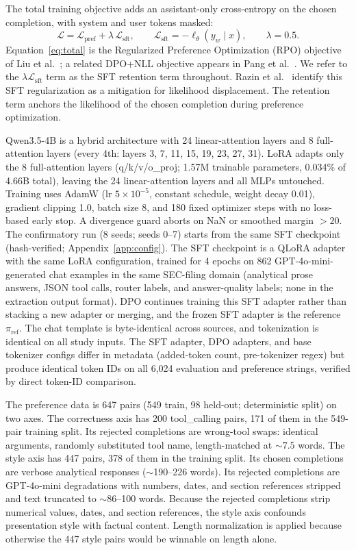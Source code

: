 \documentclass{article}
\begin{document}
The total training objective adds an assistant-only cross-entropy on the chosen completion, with system and user tokens masked:
\begin{equation}
\mathcal{L} = \mathcal{L}_{\text{pref}} + \lambda\, \mathcal{L}_{\text{sft}}, \qquad \mathcal{L}_{\text{sft}} = -\ell_\theta(y_w \mid x), \qquad \lambda = 0.5.
\label{eq:total}
\end{equation}
Equation~\eqref{eq:total} is the Regularized Preference Optimization (RPO) objective of Liu et al.\ \citep{liu2024rpo}; a related DPO+NLL objective appears in Pang et al.\ \citep{pang2024iterative}. We refer to the $\lambda \mathcal{L}_{\text{sft}}$ term as the SFT retention term throughout. Razin et al.\ \citep{razin2025displacement} identify this SFT regularization as a mitigation for likelihood displacement. The retention term anchors the likelihood of the chosen completion during preference optimization.

Qwen3.5-4B is a hybrid architecture with 24 linear-attention layers and 8 full-attention layers (every 4th: layers 3, 7, 11, 15, 19, 23, 27, 31). LoRA adapts only the 8 full-attention layers (q/k/v/o\_proj; 1.57M trainable parameters, 0.034\% of 4.66B total), leaving the 24 linear-attention layers and all MLPs untouched. Training uses AdamW (lr $5\times10^{-5}$, constant schedule, weight decay 0.01), gradient clipping 1.0, batch size 8, and 180 fixed optimizer steps with no loss-based early stop. A divergence guard aborts on NaN or smoothed margin $>20$. The confirmatory run (8 seeds; seeds 0--7) starts from the same SFT checkpoint (hash-verified; Appendix~\ref{app:config}). The SFT checkpoint is a QLoRA adapter with the same LoRA configuration, trained for 4 epochs on 862 GPT-4o-mini-generated chat examples in the same SEC-filing domain (analytical prose answers, JSON tool calls, router labels, and answer-quality labels; none in the extraction output format). DPO continues training this SFT adapter rather than stacking a new adapter or merging, and the frozen SFT adapter is the reference $\pi_{\text{ref}}$. The chat template is byte-identical across sources, and tokenization is identical on all study inputs. The SFT adapter, DPO adapters, and base tokenizer configs differ in metadata (added-token count, pre-tokenizer regex) but produce identical token IDs on all 6{,}024 evaluation and preference strings, verified by direct token-ID comparison.

The preference data is 647 pairs (549 train, 98 held-out; deterministic split) on two axes. The correctness axis has 200 tool\_calling pairs, 171 of them in the 549-pair training split. Its rejected completions are wrong-tool swaps: identical arguments, randomly substituted tool name, length-matched at ${\sim}7.5$ words. The style axis has 447 pairs, 378 of them in the training split. Its chosen completions are verbose analytical responses ($\sim$190--226 words). Its rejected completions are GPT-4o-mini degradations with numbers, dates, and section references stripped and text truncated to $\sim$86--100 words. Because the rejected completions strip numerical values, dates, and section references, the style axis confounds presentation style with factual content. Length normalization is applied because otherwise the 447 style pairs would be winnable on length alone.
\end{document}
